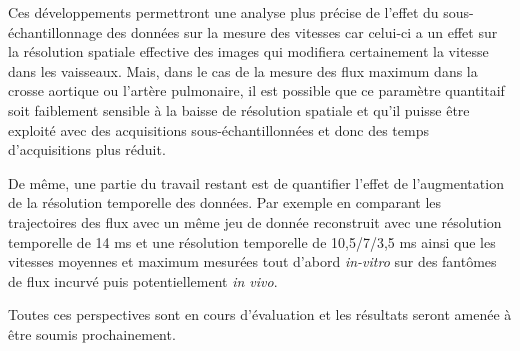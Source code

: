 Ces développements permettront une analyse plus précise de l'effet du sous-échantillonnage des données sur la mesure des vitesses car celui-ci a un effet sur la résolution spatiale effective des images qui modifiera certainement la vitesse dans les vaisseaux. Mais, dans le cas de la mesure des flux maximum dans la crosse aortique ou l'artère pulmonaire, il est possible que ce paramètre quantitaif soit faiblement sensible à la baisse de résolution spatiale et qu'il puisse être exploité avec des acquisitions sous-échantillonnées et donc des temps d'acquisitions plus réduit.

De même, une partie du travail restant est de quantifier l'effet de l'augmentation de la résolution temporelle des données. Par exemple en comparant les trajectoires des flux avec un même jeu de donnée reconstruit avec une résolution temporelle de 14 ms et une résolution temporelle de 10,5/7/3,5 ms ainsi que les vitesses moyennes et maximum  mesurées tout d'abord \textit{in-vitro} sur des fantômes de flux incurvé puis potentiellement \textit{in vivo}.

Toutes ces perspectives sont en cours d'évaluation et les résultats seront amenée à être soumis prochainement.